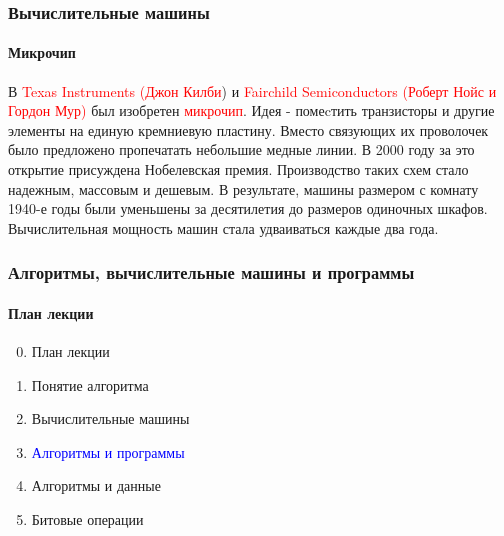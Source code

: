 \documentclass[aspectratio=169]{beamer}
\begin{document}
\begin{frame}
\frametitle{Вычислительные машины}
\framesubtitle{Микрочип}
\justifying
\small
В \textcolor{red}{Texas Instruments (Джон Килби}) и \textcolor{red}{Fairchild Semiconductors (Роберт Нойс и Гордон Мур)} был изобретен \textcolor{red}{микрочип}. Идея - помеcтить транзисторы и другие элементы на единую кремниевую пластину. Вместо связующих их проволочек было предложено пропечатать небольшие медные линии. В 2000 году за это открытие присуждена Нобелевская премия.\newline\newline 
Производство таких схем стало надежным, массовым и дешевым. В результате, машины размером с комнату 1940-е годы были уменьшены за десятилетия до размеров одиночных шкафов. Вычислительная мощность машин стала удваиваться каждые два года.

\begin{figure}
    \captionsetup[subfigure]{labelformat=empty}
    \centering
\end{figure}
\end{frame}


\begin{frame}
\frametitle{Алгоритмы, вычислительные машины и программы}
\framesubtitle{План лекции}

\begin{enumerate}
  \setcounter{enumi}{-1}
  \item{План лекции}
  \item{Понятие алгоритма}
  \item{Вычислительные машины}
  \item{\textcolor{blue}{Алгоритмы и программы}}
  \item{Алгоритмы и данные}
  \item{Битовые операции}

\end{enumerate}
\end{frame}
\end{document}
